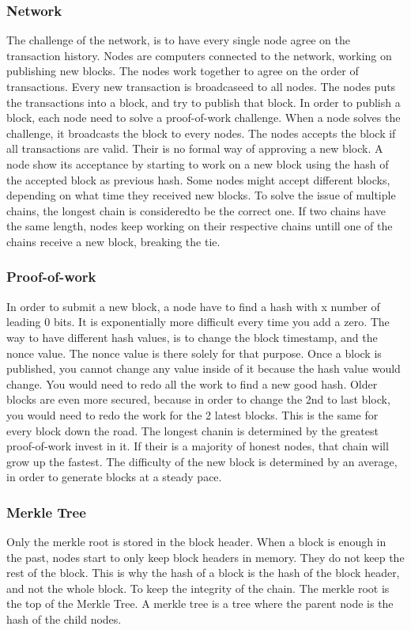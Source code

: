 \subsubsection{Network}
The challenge of the network, is to have every single node agree on the transaction history. Nodes are computers connected to the network,
working on publishing new blocks. The nodes work together to agree on the order of transactions. Every new transaction is broadcaseed to all nodes.
The nodes puts the transactions into a block, and try to publish that block. In order to publish a block, each node need to solve a proof-of-work challenge.
When a node solves the challenge, it broadcasts the block to every nodes. The nodes accepts the block if all transactions are valid. Their is no formal
way of approving a new block. A node show its acceptance by starting to work on a new block using the hash of the accepted block as previous hash.
Some nodes might accept different blocks, depending on what time they received new blocks. To solve the issue of multiple chains, the longest chain is consideredto be the correct one. 
If two chains have the same length, nodes keep working on their respective chains untill one of the chains receive a new block, breaking the tie.


\subsubsection{Proof-of-work}
In order to submit a new block, a node have to find a hash with x number of leading 0 bits.
It is exponentially more difficult every time you add a zero. The way to have different hash values, is to change the block timestamp, and the nonce value.
The nonce value is there solely for that purpose. Once a block is published, you cannot change any value inside of it because the hash value would change.
You would need to redo all the work to find a new good hash. Older blocks are even more secured, because in order to change the 2nd to last block, you would need to redo the work
for the 2 latest blocks. This is the same for every block down the road. The longest chanin is determined by the greatest proof-of-work invest in it. If their is a majority of honest nodes,
that chain will grow up the fastest. The difficulty of the new block is determined by an average, in order to generate blocks at a steady pace.


\subsubsection{Merkle Tree}
Only the merkle root is stored in the block header. When a block is enough in the past, nodes start to only keep block headers in memory.
They do not keep the rest of the block. This is why the hash of a block is the hash of the block header, and not the whole block. To keep the integrity of the chain.
The merkle root is the top of the Merkle Tree. A merkle tree is a tree where the parent node is the hash of the child nodes.


